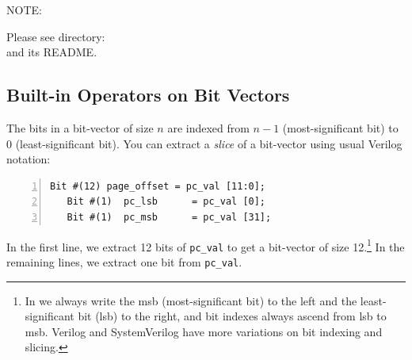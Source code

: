 NOTE: 
\vspace{2ex}

\Beginexercise

Please see directory:  \\
and its README.
\Endexercise


\subsection{Built-in Operators on Bit Vectors}

\label{Bit_Vector_Ops}

The bits in a {\BSV} bit-vector of size $n$ are indexed from $n-1$
(most-significant bit) to 0 (least-significant bit).  You can extract
a \emph{slice} of a bit-vector using usual Verilog notation:


{\footnotesize
\begin{Verbatim}[frame=single, numbers=left]
   Bit #(12) page_offset = pc_val [11:0];
   Bit #(1)  pc_lsb      = pc_val [0];
   Bit #(1)  pc_msb      = pc_val [31];
\end{Verbatim}
}

In the first line, we extract 12 bits of \verb|pc_val| to get a
bit-vector of size 12.\footnote{In {\BSV} we always write the msb
(most-significant bit) to the left and the least-significant bit (lsb)
to the right, and bit indexes always ascend from lsb to msb.  Verilog
and SystemVerilog have more variations on bit indexing and slicing.}
In the remaining lines, we extract one bit from \verb|pc_val|.

